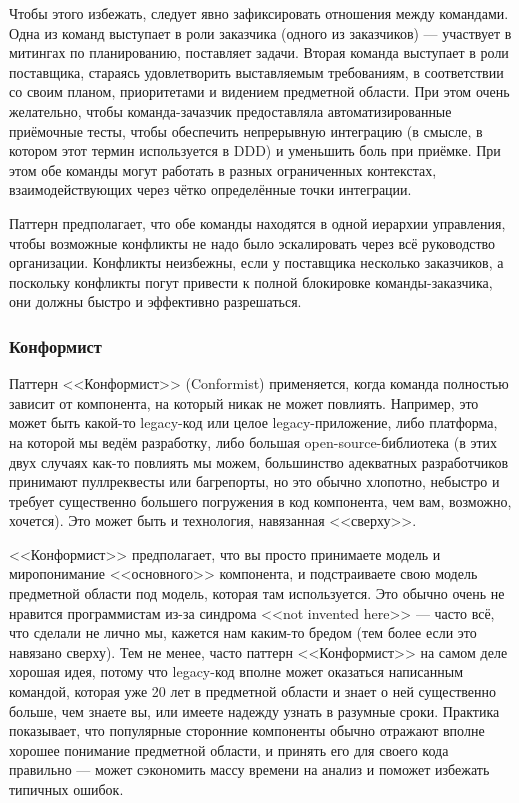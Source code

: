 \documentclass[a5paper]{article}
\begin{document}
Чтобы этого избежать, следует явно зафиксировать отношения между командами. Одна из команд выступает в роли заказчика (одного из заказчиков) --- участвует в митингах по планированию, поставляет задачи. Вторая команда выступает в роли поставщика, стараясь удовлетворить выставляемым требованиям, в соответствии со своим планом, приоритетами и видением предметной области. При этом очень желательно, чтобы команда-зачазчик предоставляла автоматизированные приёмочные тесты, чтобы обеспечить непрерывную интеграцию (в смысле, в котором этот термин используется в DDD) и уменьшить боль при приёмке. При этом обе команды могут работать в разных ограниченных контекстах, взаимодействующих через чётко определённые точки интеграции.

Паттерн предполагает, что обе команды находятся в одной иерархии управления, чтобы возможные конфликты не надо было эскалировать через всё руководство организации. Конфликты неизбежны, если у поставщика несколько заказчиков, а поскольку конфликты погут привести к полной блокировке команды-заказчика, они должны быстро и эффективно разрешаться.

\subsubsection{Конформист}

Паттерн <<Конформист>> (Conformist) применяется, когда команда полностью зависит от компонента, на который никак не может повлиять. Например, это может быть какой-то legacy-код или целое legacy-приложение, либо платформа, на которой мы ведём разработку, либо большая open-source-библиотека (в этих двух случаях как-то повлиять мы можем, большинство адекватных разработчиков принимают пуллреквесты или багрепорты, но это обычно хлопотно, небыстро и требует существенно большего погружения в код компонента, чем вам, возможно, хочется). Это может быть и технология, навязанная <<сверху>>.

<<Конформист>> предполагает, что вы просто принимаете модель и миропонимание <<основного>> компонента, и подстраиваете свою модель предметной области под модель, которая там используется. Это обычно очень не нравится программистам из-за синдрома <<not invented here>> --- часто всё, что сделали не лично мы, кажется нам каким-то бредом (тем более если это навязано сверху). Тем не менее, часто паттерн <<Конформист>> на самом деле хорошая идея, потому что legacy-код вполне может оказаться написанным командой, которая уже 20 лет в предметной области и знает о ней существенно больше, чем знаете вы, или имеете надежду узнать в разумные сроки. Практика показывает, что популярные сторонние компоненты обычно отражают вполне хорошее понимание предметной области, и принять его для своего кода правильно --- может сэкономить массу времени на анализ и поможет избежать типичных ошибок.
\end{document}
